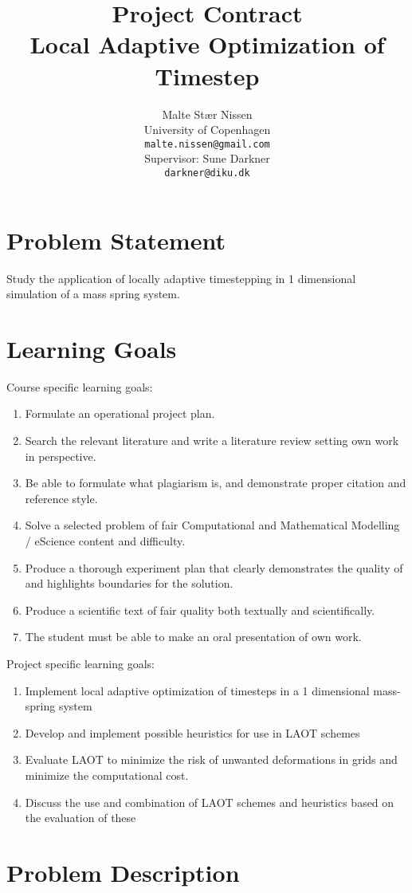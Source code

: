 \documentclass[11pt,a4paper]{article}
\title{Project Contract\\Local Adaptive Optimization of Timestep}
\author{Malte Stær Nissen\\University of Copenhagen\\\texttt{malte.nissen@gmail.com}\\Supervisor: Sune Darkner\\\texttt{darkner@diku.dk}}
\begin{document}
\maketitle

\section{Problem Statement}
Study the application of locally adaptive timestepping in 1 dimensional
simulation of a mass spring system.

\section{Learning Goals}
Course specific learning goals:
\begin{enumerate}
	\item Formulate an operational project plan.
	\item Search the relevant literature and write a literature review setting own work in perspective.
	\item Be able to formulate what plagiarism is, and demonstrate proper citation and reference style.
	\item Solve a selected problem of fair Computational and Mathematical Modelling / eScience content and difficulty.
	\item Produce a thorough experiment plan that clearly demonstrates the quality of and highlights boundaries for the solution. 
	\item Produce a scientific text of fair quality both textually and scientifically.
	\item The student must be able to make an oral presentation of own work.
\end{enumerate}
Project specific learning goals:
\begin{enumerate}
    \item Implement local adaptive optimization of timesteps in a 1
dimensional mass-spring system
    \item Develop and implement possible heuristics for use in LAOT schemes
	\item Evaluate LAOT to minimize the risk of unwanted deformations in grids
        and minimize the computational cost.
    \item Discuss the use and combination of LAOT schemes and heuristics based
        on the evaluation of these
\end{enumerate}

\section{Problem Description}
\end{document}
